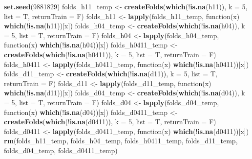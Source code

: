 \documentclass[11pt,]{article}
\newenvironment{Shaded}{\begin{snugshade}}{\end{snugshade}}
\newcommand{\KeywordTok}[1]{\textcolor[rgb]{0.13,0.29,0.53}{\textbf{{#1}}}}
\newcommand{\DataTypeTok}[1]{\textcolor[rgb]{0.13,0.29,0.53}{{#1}}}
\newcommand{\DecValTok}[1]{\textcolor[rgb]{0.00,0.00,0.81}{{#1}}}
\newcommand{\StringTok}[1]{\textcolor[rgb]{0.31,0.60,0.02}{{#1}}}
\newcommand{\NormalTok}[1]{{#1}}
\begin{document}
\begin{Shaded}
\begin{Highlighting}[]
{\KeywordTok{set.seed}\NormalTok{(}\DecValTok{9881829}\NormalTok{)}
\NormalTok{folds_h11_temp <-}\StringTok{ }\KeywordTok{createFolds}\NormalTok{(}\KeywordTok{which}\NormalTok{(!}\KeywordTok{is.na}\NormalTok{(h11)), }\DataTypeTok{k =} \DecValTok{5}\NormalTok{, }\DataTypeTok{list =} \NormalTok{T, }\DataTypeTok{returnTrain =} \NormalTok{F)}
\NormalTok{folds_h11 <-}\StringTok{ }\KeywordTok{lapply}\NormalTok{(folds_h11_temp, function(x) }\KeywordTok{which}\NormalTok{(!}\KeywordTok{is.na}\NormalTok{(h11))[x])}
\NormalTok{folds_h04_temp <-}\StringTok{ }\KeywordTok{createFolds}\NormalTok{(}\KeywordTok{which}\NormalTok{(!}\KeywordTok{is.na}\NormalTok{(h04)), }\DataTypeTok{k =} \DecValTok{5}\NormalTok{, }\DataTypeTok{list =} \NormalTok{T, }\DataTypeTok{returnTrain =} \NormalTok{F)}
\NormalTok{folds_h04 <-}\StringTok{ }\KeywordTok{lapply}\NormalTok{(folds_h04_temp, function(x) }\KeywordTok{which}\NormalTok{(!}\KeywordTok{is.na}\NormalTok{(h04))[x])}
\NormalTok{folds_h0411_temp <-}\StringTok{ }\KeywordTok{createFolds}\NormalTok{(}\KeywordTok{which}\NormalTok{(!}\KeywordTok{is.na}\NormalTok{(h0411)), }\DataTypeTok{k =} \DecValTok{5}\NormalTok{, }\DataTypeTok{list =} \NormalTok{T, }\DataTypeTok{returnTrain =} \NormalTok{F)}
\NormalTok{folds_h0411 <-}\StringTok{ }\KeywordTok{lapply}\NormalTok{(folds_h0411_temp, function(x) }\KeywordTok{which}\NormalTok{(!}\KeywordTok{is.na}\NormalTok{(h0411))[x])}
\NormalTok{folds_d11_temp <-}\StringTok{ }\KeywordTok{createFolds}\NormalTok{(}\KeywordTok{which}\NormalTok{(!}\KeywordTok{is.na}\NormalTok{(d11)), }\DataTypeTok{k =} \DecValTok{5}\NormalTok{, }\DataTypeTok{list =} \NormalTok{T, }\DataTypeTok{returnTrain =} \NormalTok{F)}
\NormalTok{folds_d11 <-}\StringTok{ }\KeywordTok{lapply}\NormalTok{(folds_d11_temp, function(x) }\KeywordTok{which}\NormalTok{(!}\KeywordTok{is.na}\NormalTok{(d11))[x])}
\NormalTok{folds_d04_temp <-}\StringTok{ }\KeywordTok{createFolds}\NormalTok{(}\KeywordTok{which}\NormalTok{(!}\KeywordTok{is.na}\NormalTok{(d04)), }\DataTypeTok{k =} \DecValTok{5}\NormalTok{, }\DataTypeTok{list =} \NormalTok{T, }\DataTypeTok{returnTrain =} \NormalTok{F)}
\NormalTok{folds_d04 <-}\StringTok{ }\KeywordTok{lapply}\NormalTok{(folds_d04_temp, function(x) }\KeywordTok{which}\NormalTok{(!}\KeywordTok{is.na}\NormalTok{(d04))[x])}
\NormalTok{folds_d0411_temp <-}\StringTok{ }\KeywordTok{createFolds}\NormalTok{(}\KeywordTok{which}\NormalTok{(!}\KeywordTok{is.na}\NormalTok{(d0411)), }\DataTypeTok{k =} \DecValTok{5}\NormalTok{, }\DataTypeTok{list =} \NormalTok{T, }\DataTypeTok{returnTrain =} \NormalTok{F)}
\NormalTok{folds_d0411 <-}\StringTok{ }\KeywordTok{lapply}\NormalTok{(folds_d0411_temp, function(x) }\KeywordTok{which}\NormalTok{(!}\KeywordTok{is.na}\NormalTok{(d0411))[x])}
\KeywordTok{rm}\NormalTok{(folds_h11_temp, folds_h04_temp, folds_h0411_temp, folds_d11_temp, folds_d04_temp, }
    \NormalTok{folds_d0411_temp)}

}
\end{Highlighting}
\end{Shaded}
\end{document}
